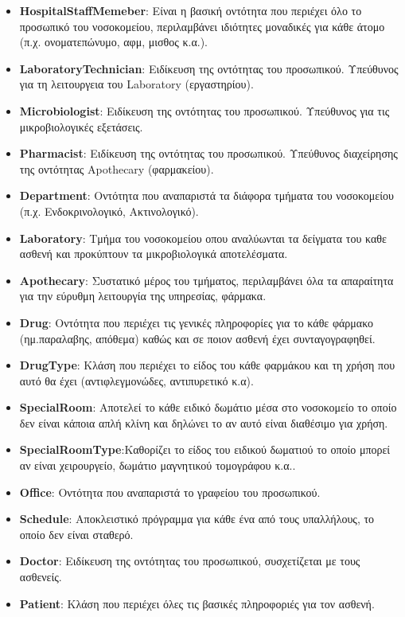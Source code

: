 \documentclass{article}
\begin{document}
\begin{itemize}
    \item \textbf{HospitalStaffMemeber}: Είναι η βασική οντότητα που περιέχει όλο το προσωπικό του νοσοκομείου, περιλαμβάνει ιδιότητες μοναδικές για κάθε άτομο (π.χ. ονοματεπώνυμο, αφμ, μισθος κ.α.).
    \item \textbf{LaboratoryTechnician}: Ειδίκευση της οντότητας του προσωπικού. Υπεύθυνος για τη λειτουργεια του Laboratory (εργαστηρίου).
    \item \textbf{Microbiologist}: Ειδίκευση της οντότητας του προσωπικού. Υπεύθυνος για τις μικροβιολογικές εξετάσεις.
    \item \textbf{Pharmacist}: Ειδίκευση της οντότητας του προσωπικού. Υπεύθυνος διαχείρησης της οντότητας Apothecary (φαρμακείου).
    \item \textbf{Department}: Οντότητα που αναπαριστά τα διάφορα τμήματα του νοσοκομείου (π.χ. Ενδοκρινολογικό, Ακτινολογικό).
    \item \textbf{Laboratory}: Τμήμα του νοσοκομείου οπου αναλύωνται τα δείγματα του καθε ασθενή και προκύπτουν τα μικροβιολογικά αποτελέσματα. 
    \item \textbf{Apothecary}: Συστατικό μέρος του τμήματος, περιλαμβάνει όλα τα απαραίτητα για την εύρυθμη λειτουργία της υπηρεσίας, φάρμακα.
    \item \textbf{Drug}: Οντότητα που περιέχει τις γενικές πληροφορίες για το κάθε φάρμακο (ημ.παραλαβης, απόθεμα) καθώς και σε ποιον ασθενή έχει συνταγογραφηθεί.
    \item \textbf{DrugType}: Κλάση που περιέχει το είδος του κάθε φαρμάκου και τη χρήση που αυτό θα έχει (αντιφλεγμονώδες, αντιπυρετικό κ.α).
    \item \textbf{SpecialRoom}: Αποτελεί το κάθε ειδικό δωμάτιο μέσα στο νοσοκομείο το οποίο δεν είναι κάποια απλή κλίνη και δηλώνει το αν αυτό είναι διαθέσιμο για χρήση.
    \item \textbf{SpecialRoomType}:Καθορίζει το είδος του ειδικού δωματιού το οποίο μπορεί αν είναι χειρουργείο, δωμάτιο μαγνητικού τομογράφου κ.α..
    \item \textbf{Office}: Οντότητα που αναπαριστά το γραφείου του προσωπικού.
    \item \textbf{Schedule}: Αποκλειστικό πρόγραμμα για κάθε ένα από τους υπαλλήλους, το οποίο δεν είναι σταθερό.
    \item \textbf{Doctor}: Ειδίκευση της οντότητας του προσωπικού, συσχετίζεται με τους ασθενείς.
    \item \textbf{Patient}: Κλάση που περιέχει όλες τις βασικές πληροφοριές για τον ασθενή.

\end{itemize}
\end{document}
